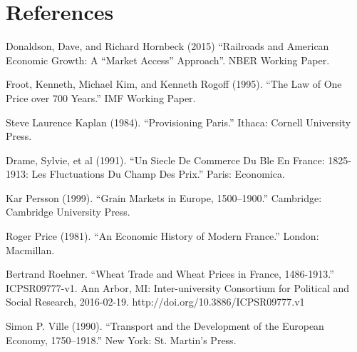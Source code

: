 \documentclass[12pt,twoside]{article}
\begin{document}
\section{References}
\begin{footnotesize}
	
\begin{hangparas}{0.25in}{1}

	Donaldson, Dave, and Richard Hornbeck (2015) ``Railroads and American Economic Growth: A ``Market Access'' Approach''. NBER Working Paper.

	Froot, Kenneth, Michael Kim, and Kenneth Rogoff (1995). ``The Law of One Price over 700 Years.'' IMF Working Paper.

	Steve Laurence Kaplan (1984). ``Provisioning Paris.'' Ithaca: Cornell University Press.

	Drame, Sylvie, et al (1991). ``Un Siecle De Commerce Du Ble En France: 1825-1913: Les Fluctuations Du Champ Des Prix.'' Paris: Economica.

	Kar Persson (1999). ``Grain Markets in Europe, 1500--1900.'' Cambridge: Cambridge University Press.

	Roger Price (1981). ``An Economic History of Modern France.'' London: Macmillan.

	Bertrand Roehner. ``Wheat Trade and Wheat Prices in France, 1486-1913.'' ICPSR09777-v1. Ann Arbor, MI: Inter-university Consortium for Political and Social Research, 2016-02-19. http://doi.org/10.3886/ICPSR09777.v1

	Simon P. Ville (1990). ``Transport and the Development of the European Economy, 1750--1918.'' New York: St. Martin's Press.

\end{hangparas}
\end{footnotesize}
\end{document}
